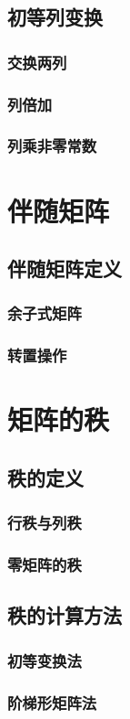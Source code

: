 \documentclass[a4paper,12pt]{article}
\begin{document}
    \subsection{初等列变换}
    \subsubsection{交换两列}
    \subsubsection{列倍加}
    \subsubsection{列乘非零常数}

    \section{伴随矩阵}
    \subsection{伴随矩阵定义}
    \subsubsection{余子式矩阵}
    \subsubsection{转置操作}

    \section{矩阵的秩}
    \subsection{秩的定义}
    \subsubsection{行秩与列秩}
    \subsubsection{零矩阵的秩}
    \subsection{秩的计算方法}
    \subsubsection{初等变换法}
    \subsubsection{阶梯形矩阵法}
\end{document}
